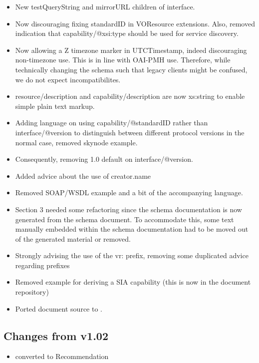 \documentclass[11pt,a4paper]{ivoa}
\begin{document}
\begin{itemize}
\item New testQueryString and mirrorURL children of interface.

\item Now discouraging fixing standardID in VOResource extensions.
Also, removed indication that capability/@xsi:type should be used for
service discovery.

\item Now allowing a Z timezone marker in UTCTimestamp, indeed
discouraging non-timezone use.  This is in line with OAI-PMH use.
Therefore, while technically changing the schema such that legacy
clients  might be confused, we do not expect incompatibilites.

\item resource/description and capability/description are now xs:string
to enable simple plain text markup.

\item Adding language on using capability/@standardID rather than
interface/@version to distinguish between different protocol versions in
the normal case, removed skynode example.

\item Consequently, removing 1.0 default on interface/@version.

\item Added advice about the use of creator.name

\item Removed SOAP/WSDL example and a bit of the accompanying language.

\item Section 3 needed some refactoring since the schema documentation
is now generated from the schema document.  To accommodate this, some
text manually embedded within the schema documentation had to be moved
out of the generated material or removed.

\item Strongly advising the use of the vr: prefix, removing some
duplicated advice regarding prefixes

\item Removed example for deriving a SIA capability (this is now
in the document repository)

\item Ported document source to \ivoatex.
\end{itemize}

\subsection{Changes from v1.02}
\begin{itemize}
  \item converted to Recommendation
\end{itemize}
\end{document}

